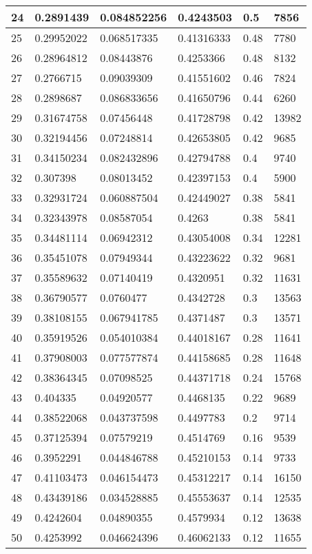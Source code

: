 \begin{longtable}{|l|l|l|l|l|l|}
24 & 0.2891439 & 0.084852256 & 0.4243503 & 0.5 & 7856 \\ \hline 
25 & 0.29952022 & 0.068517335 & 0.41316333 & 0.48 & 7780 \\ \hline 
26 & 0.28964812 & 0.08443876 & 0.4253366 & 0.48 & 8132 \\ \hline 
27 & 0.2766715 & 0.09039309 & 0.41551602 & 0.46 & 7824 \\ \hline 
28 & 0.2898687 & 0.086833656 & 0.41650796 & 0.44 & 6260 \\ \hline 
29 & 0.31674758 & 0.07456448 & 0.41728798 & 0.42 & 13982 \\ \hline 
30 & 0.32194456 & 0.07248814 & 0.42653805 & 0.42 & 9685 \\ \hline 
31 & 0.34150234 & 0.082432896 & 0.42794788 & 0.4 & 9740 \\ \hline 
32 & 0.307398 & 0.08013452 & 0.42397153 & 0.4 & 5900 \\ \hline 
33 & 0.32931724 & 0.060887504 & 0.42449027 & 0.38 & 5841 \\ \hline 
34 & 0.32343978 & 0.08587054 & 0.4263 & 0.38 & 5841 \\ \hline 
35 & 0.34481114 & 0.06942312 & 0.43054008 & 0.34 & 12281 \\ \hline 
36 & 0.35451078 & 0.07949344 & 0.43223622 & 0.32 & 9681 \\ \hline 
37 & 0.35589632 & 0.07140419 & 0.4320951 & 0.32 & 11631 \\ \hline 
38 & 0.36790577 & 0.0760477 & 0.4342728 & 0.3 & 13563 \\ \hline 
39 & 0.38108155 & 0.067941785 & 0.4371487 & 0.3 & 13571 \\ \hline 
40 & 0.35919526 & 0.054010384 & 0.44018167 & 0.28 & 11641 \\ \hline 
41 & 0.37908003 & 0.077577874 & 0.44158685 & 0.28 & 11648 \\ \hline 
42 & 0.38364345 & 0.07098525 & 0.44371718 & 0.24 & 15768 \\ \hline 
43 & 0.404335 & 0.04920577 & 0.4468135 & 0.22 & 9689 \\ \hline 
44 & 0.38522068 & 0.043737598 & 0.4497783 & 0.2 & 9714 \\ \hline 
45 & 0.37125394 & 0.07579219 & 0.4514769 & 0.16 & 9539 \\ \hline 
46 & 0.3952291 & 0.044846788 & 0.45210153 & 0.14 & 9733 \\ \hline 
47 & 0.41103473 & 0.046154473 & 0.45312217 & 0.14 & 16150 \\ \hline 
48 & 0.43439186 & 0.034528885 & 0.45553637 & 0.14 & 12535 \\ \hline 
49 & 0.4242604 & 0.04890355 & 0.4579934 & 0.12 & 13638 \\ \hline 
50 & 0.4253992 & 0.046624396 & 0.46062133 & 0.12 & 11655 \\ \hline 
\end{longtable}